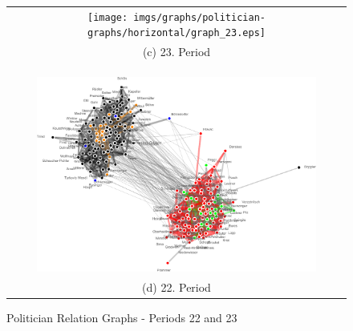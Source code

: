\begin{figure}
\center
\begin{tabular}{ c }
	\texttt{[image: imgs/graphs/politician-graphs/horizontal/graph\_23.eps]}
	\\
	(c) 23. Period
	\\
	
	\\
	\hline
	\\
	\\ \includegraphics[width=0.85\textwidth]{imgs/graphs/politician-graphs/horizontal/graph_22.eps}
	\\
	(d) 22. Period
	
\end{tabular}
	
	
	\caption{Politician Relation Graphs - Periods 22 and 23}
	\label{fig:pol_graphs_22_23}
\end{figure}

